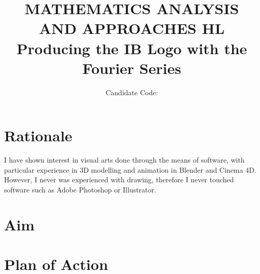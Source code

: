 \documentclass{article}
\title{MATHEMATICS ANALYSIS AND APPROACHES HL
\\
Producing the IB Logo with the Fourier Series}
\author{Candidate Code:}
\date{}
\begin{document}
\maketitle
\newpage

\section{Rationale}

I have shown interest in visual arts done through the means of software,
with particular experience in 3D modelling and animation in Blender
and Cinema 4D. However, I never was experienced with drawing, therefore
I never touched software such as Adobe Photoshop or Illustrator.

\section{Aim}

\section{Plan of Action}

\cite{Sanderson}



\end{document}
